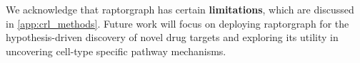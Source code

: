 We acknowledge that \gls{raptorgraph} has certain \textbf{limitations}, which are discussed in \cref{app:crl_methods}. Future work will focus on deploying \gls{raptorgraph} for the hypothesis-driven discovery of novel drug targets and exploring its utility in uncovering cell-type specific pathway mechanisms.



